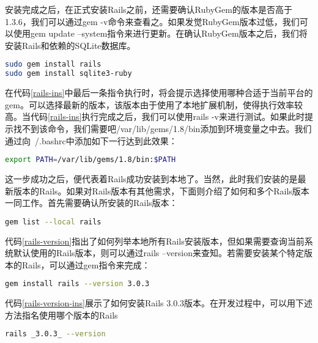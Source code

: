 安装完成之后，在正式安装Rails之前，还需要确认RubyGem的版本是否高于1.3.6，我们可以通过gem -v命令来查看之。如果发觉RubyGem版本过低，我们可以使用gem update --system指令来进行更新。在确认RubyGem版本之后，我们将安装Rails和依赖的SQLite数据库。

\begin{lstlisting}[caption={安装Rails及SQLite}, label=rails-ins, language=bash]
sudo gem install rails
sudo gem install sqlite3-ruby
\end{lstlisting}

在代码\ref{rails-ins}中最后一条指令执行时，将会提示选择使用哪种合适于当前平台的gem。可以选择最新的版本，该版本由于使用了本地扩展机制，使得执行效率较高。当代码\ref{rails-ins}执行完成之后，我们可以使用rails -v来进行测试。如果此时提示找不到该命令，我们需要吧/var/lib/gems/1.8/bin添加到环境变量之中去。我们通过向~/.bashrc中添加如下一行达到此效果：

\begin{lstlisting}[caption={添加Rails环境变量}, label=rails-env, language=bash, numbers=none]
export PATH=/var/lib/gems/1.8/bin:$PATH
\end{lstlisting}

这一步成功之后，便代表着Rails成功安装到本地了。当然，此时我们安装的是最新版本的Rails。如果对Rails版本有其他需求，下面则介绍了如何和多个Rails版本一同工作。首先需要确认所安装的Rails版本：

\begin{lstlisting}[caption={枚举本地Rails版本}, label=rails-version, language=bash, numbers=none]
gem list --local rails
\end{lstlisting}

代码\ref{rails-version}指出了如何列举本地所有Rails安装版本，但如果需要查询当前系统默认使用的Rails版本，则可以通过rails --version来查知。若需要安装某个特定版本的Rails，可以通过gem指令来完成：

\begin{lstlisting}[caption={安装特定版本的Rails}, label=rails-version-ins, language=bash, numbers=none]
gem install rails --version 3.0.3
\end{lstlisting}

代码\ref{rails-version-ins}展示了如何安装Rails 3.0.3版本。在开发过程中，可以用下述方法指名使用哪个版本的Rails

\begin{lstlisting}[caption={指定使用特定版本的Rails}, label=rails-version-ins, language=bash, numbers=none]
rails _3.0.3_ --version
\end{lstlisting}

